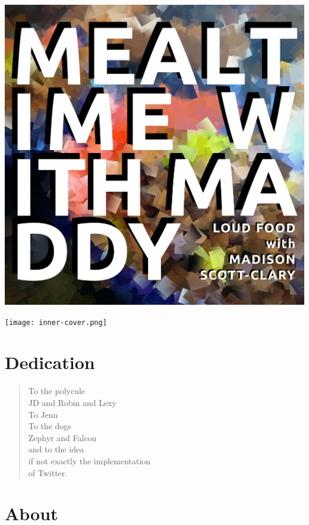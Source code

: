\documentclass{memoir}
\begin{document}
\frontmatter
\includegraphics[width=\textwidth]{cover.png}
\thispagestyle{empty}
\newpage

\texttt{[image: inner-cover.png]}
\thispagestyle{empty}
\newpage


\tableofcontents*

\chapter*{Dedication}

\begin{verse}
  To the polycule\\
  \vin JD and Robin and Lexy\\
  To Jenn\\
  To the dogs\\
  \vin Zephyr and Falcon\\
  and to the idea\\
  \vin if not exactly the implementation\\
  \vin \vin of Twitter.
\end{verse}

\chapter{About}
\end{document}
